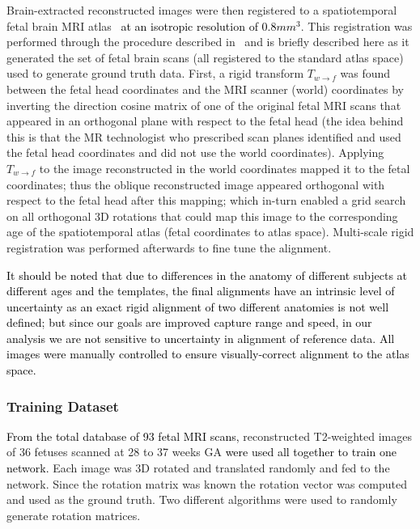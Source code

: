 \documentclass[journal,transmag]{IEEEtran}
\begin{document}
Brain-extracted reconstructed images were then registered to a spatiotemporal fetal brain MRI atlas~\cite{gholipour2017normative} \textcolor{black}{at an isotropic resolution of $0.8mm^3$}. This registration was performed through the procedure described in~\cite{gholipour2017normative} and is briefly described here as it generated the set of fetal brain scans (all registered to the standard atlas space) used to generate ground truth data. First, a rigid transform $T_{w\rightarrow f}$ was found between the fetal head coordinates and the MRI scanner (world) coordinates by inverting the direction cosine matrix of one of the original fetal MRI scans that appeared in an orthogonal plane with respect to the fetal head (the idea behind this is that the MR technologist who prescribed scan planes identified and used the fetal head coordinates and did not use the world coordinates). Applying $T_{w\rightarrow f}$ to the image reconstructed in the world coordinates mapped it to the fetal coordinates; thus the oblique reconstructed image appeared orthogonal with respect to the fetal head after this mapping; which in-turn enabled a grid search on all orthogonal 3D rotations that could map this image to the corresponding age of the spatiotemporal atlas (fetal coordinates to atlas space). Multi-scale rigid registration was performed afterwards to fine tune the alignment.

\textcolor{black}{It should be noted that due to differences in the anatomy of different subjects at different ages and the templates, \textcolor{black}{the final alignments have an intrinsic level of uncertainty as an exact rigid alignment of two different anatomies is not well defined;} but since our goals are improved capture range and speed, in our analysis we are not sensitive to uncertainty in alignment of reference data. %
All images were manually controlled to ensure visually-correct alignment to the atlas space.}

\subsubsection{Training Dataset}
\label{sec:trainset}
\textcolor{black}{From the total database of 93 fetal MRI scans,} reconstructed T2-weighted images of 36 fetuses scanned at 28 to 37 weeks GA \textcolor{black}{were used all together to train one network.} Each image was 3D rotated and translated randomly and fed to the network. Since the rotation matrix was known the rotation vector was computed and used as the ground truth. Two different algorithms were used to randomly generate rotation matrices.
\end{document}

